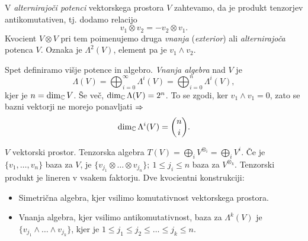 \begin{defin}
	V {\em alternirajo\v ci potenci} vektorskega prostora $V$ zahtevamo, da je produkt tenzorjev antikomutativen, tj. dodamo
	relacijo
	\[
		v_1 \otimes v_2 = - v_2 \otimes v_1.
	\]
	Kvocient $V \otimes V$ pri tem poimenujemo druga {\em vnanja} ({\em exterior}) ali {\em alternirajo\v ca} potenca $V$.
	Oznaka je $\Lambda^2 (V)$, element pa je $v_1 \wedge v_2$.

	Spet definiramo vi\v sje potence in algebro. {\em Vnanja algebra} nad $V$ je 
	\[
		\Lambda(V) = \bigoplus_{i = 0}^\infty \Lambda^i (V) = \bigoplus_{i = 0}^n \Lambda^i (V),
	\]
	kjer je $n = \dim_{\mathbb{C}} V$. \v Se ve\v c, $\dim_{\mathbb{C}} \Lambda(V) = 2^n$. To se zgodi, ker $v_1 \wedge v_1 = 0$, zato se
	bazni vektorji ne morejo ponavljati $\Rightarrow$
	\[
		\dim_{\mathbb{C}} \Lambda^i (V) = \binom{n}{i}.
	\]
\end{defin}

$V$ vektorski prostor. Tenzorska algebra $T(V) = \bigoplus_i V^{\otimes_i} = \bigoplus_i V^i$. \v Ce je $\{v_1, \ldots, v_n\}$ baza
za $V$, je $\{v_{j_1} \otimes \ldots \otimes v_{j_n}\};\ 1 \leq j_i \leq n$ baza za $V^{\otimes_k}$. Tenzorski produkt je lineren
v vsakem faktorju. Dve kvocientni konstrukciji:
\begin{itemize}
	\item{Simetri\v cna algebra, kjer vsilimo komutativnost vektorskega prostora.}
	\item{Vnanja algebra, kjer vsilimo antikomutativnost, baza za $\Lambda^k(V)$ je $\{v_{j_1} \wedge \ldots \wedge v_{j_k}\}$,
		kjer je $1 \leq j_1 \leq j_2 \leq \ldots \leq j_k \leq n$.}
\end{itemize}

